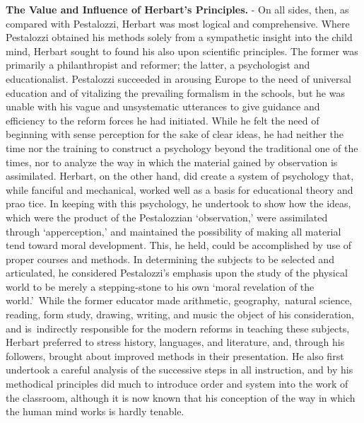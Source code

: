 \documentclass[]{book}
\begin{document}
\textbf{The Value and Influence of Herbart's Principles.} - On all sides, then, as compared with Pestalozzi, Herbart was most logical and comprehensive. Where Pestalozzi obtained his methods solely from a sympathetic insight into the child mind, Herbart sought to found his also upon scientific principles. The former was primarily a philanthropist and reformer; the latter, a psychologist and educationalist. Pestalozzi succeeded in arousing Europe to the need of universal education and of vitalizing the prevailing formalism in the schools, but he was unable with his vague and unsystematic utterances to give guidance and efficiency to the reform forces he had initiated. While he felt the need of beginning with sense perception for the sake of clear ideas, he had neither the time nor the training to construct a psychology beyond the traditional one of the times, nor to analyze the way in which the material gained by observation is assimilated. Herbart, on the other hand, did create a system of psychology that, while fanciful and mechanical, worked well as a basis for educational theory and prao tice. In keeping with this psychology, he undertook to show how the ideas, which were the product of the Pestalozzian `observation,' were assimilated through `apperception,' and maintained the possibility of making all material tend toward moral development. This, he held, could be accomplished by use of proper courses and methods. In determining the subjects to be selected and articulated, he considered Pestalozzi's emphasis upon the study of the physical world to be merely a stepping-stone to his own `moral revelation of the world.'~While the former educator made arithmetic, geography,~natural science, reading, form study, drawing, writing, and music the object of his consideration, and is~indirectly responsible for the modern reforms in teaching these subjects, Herbart preferred to stress history, languages, and literature, and, through his followers, brought about improved methods in their presentation. He also first undertook a careful analysis of the successive steps in all instruction, and by his methodical principles did much to introduce order and system into the work of the classroom, although it is now known that his conception of the way in which the human mind works is hardly tenable.
\end{document}
